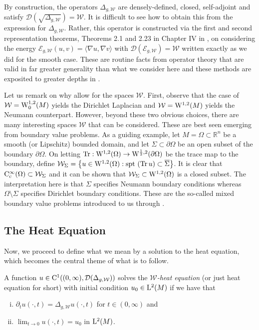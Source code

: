 \documentclass[a4paper, 12pt]{amsart}
\numberwithin{equation}{section}
\renewcommand{\~}{\tilde}
\renewcommand{\-}{\bar}
\newcommand{\R}{\mathbb{R}}
\newcommand{\8}{\infty}
\newcommand{\cW}{\mathcal{W}}
\DeclareMathOperator{\Tr}{Tr}
\newcommand{\dbrac}[1]{\left\{#1\right\}}
\newcommand{\set}[1]{\dbrac{#1}}
\newcommand{\dom}{ {\mathcal{D}}}
\newcommand{\script}[1]{\mathscr{#1}}
\newcommand{\close}[1]{\overline{#1}}		%
\newcommand{\spt}[1]{{\rm spt} {\text{ }}#1}	%
\newcommand{\inprod}[1]{\langle #1 \rangle}	%
\newcommand{\Lp}[2][{}]{{\rm L}^{#2}_{\rm #1}}		%
\newcommand{\Ck}[2][{}]{{\rm C}^{#2}_{\rm #1}}		%
\newcommand{\Sob}[2][{}]{{\rm W}^{#2}_{\rm #1}}		%
\newcommand{\SobH}[2][{}]{{\Sob[#1]{#2,2}}}	%
\newcommand{\sE}{\script{E}}
\begin{document}
By construction, the  operators $\Delta_{g,\cW}$ 
are densely-defined, closed, self-adjoint and satisfy 
$\dom(\sqrt{\Delta_{g,\cW}}) = \cW$.
It is difficult to see how to obtain this from the expression for $\Delta_{g,\cW}$.
Rather, this operator is constructed via the first and second representation 
theorems, Theorems 2.1 and 2.23 in Chapter IV in \cite{Kato}, on considering the   
energy $\sE_{g,\cW}(u,v) = \inprod{\nabla u, \nabla v}$ 
with $\dom(\sE_{g,\cW}) = \cW$ written exactly as we did for the smooth case.
These are routine facts from operator theory that are valid in far greater generality 
than what we consider here and these methods are exposited to 
greater depths in \cite{Yosida, Kato}.
 
Let us remark on why allow for the spaces \(\cW\). First, observe that the case of $\cW = \SobH[0]{1}(M)$
yields the Dirichlet Laplacian
and $\cW = \SobH{1}(M)$ yields the Neumann counterpart.
However, beyond these two obvious choices, 
there are many interesting spaces $\cW$ that
can be considered. These are best
seen emerging from boundary value problems.
As a guiding example, let $M = \Omega \subset \R^n$
be a smooth (or Lipschitz) bounded domain, and let $\Sigma \subset \partial \Omega$
be an open subset of the boundary $\partial \Omega$.
On letting $\Tr: \SobH{1}(\Omega) \to \SobH{\frac{1}{2}}(\partial \Omega)$
be the trace map to the boundary, define 
$\cW_{\Sigma} = \set{u \in \SobH{1}(\Omega): \spt (\Tr u) \subset \close{\Sigma}}$. 
It is clear that $\Ck[c]{\infty}(\Omega) \subset \cW_{\Sigma}$ and
it can be shown that $\cW_{\Sigma} \subset \SobH{1}(\Omega)$
is a closed subset. 
The interpretation here is that $\Sigma$ specifies Neumann boundary conditions whereas $\Omega \setminus \Sigma$
specifies Dirichlet boundary conditions. 
These are the so-called mixed boundary value problems 
introduced to us through \cite{AKM2}.

\subsection{The Heat Equation}

Now, we proceed to define what we mean by a solution to the heat
equation, which becomes the central theme of what is to follow.

\begin{defn}
A function \(u \in \Ck{1}((0,\infty),  \dom(\Delta_{g,\cW}))\) solves the \emph{\(\cW\)-heat equation} (or just heat equation for short) with initial condition $u_0 \in \Lp{2}(M)$ if we have that
\begin{enumerate}[(i)]
\item  $\partial_t u (\cdot, t) = \Delta_{g,\cW} u(\cdot, t)$ for $t \in (0, \infty)$ and 
\item $\lim_{t \to 0} u(\cdot, t) = u_0$ in $\Lp{2}(M)$.
\end{enumerate}
\end{defn}
\end{document}
